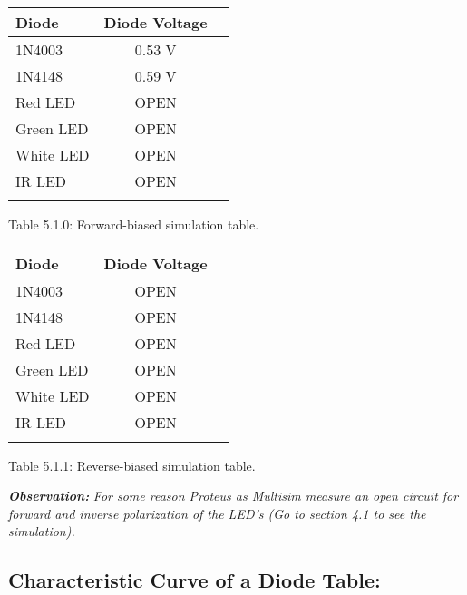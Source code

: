 \documentclass[10pt,a4paper]{article}
\begin{document}
\begin{multicols}{2}
\begin{center}
\begin{tabular}[.5cm]{l c c }
\toprule
Diode & Diode Voltage \\
\midrule
1N4003 & 0.53 V \\
\cmidrule{1-2}
1N4148 &  0.59 V \\
\cmidrule{1-2}
Red LED & OPEN \\
\cmidrule{1-2}
Green LED & OPEN \\
\cmidrule{1-2}
White LED & OPEN \\
\cmidrule{1-2}
IR LED & OPEN \\
\bottomrule
\linebreak
\end{tabular}
\centering \linebreak \linebreak Table 5.1.0: Forward-biased simulation table.
\end{center} 

\begin{center}
\begin{tabular}[.5cm]{l c c }
\toprule
Diode & Diode Voltage \\
\midrule
1N4003 & OPEN \\
\cmidrule{1-2}
1N4148 & OPEN \\
\cmidrule{1-2}
Red LED & OPEN \\
\cmidrule{1-2}
Green LED & OPEN \\
\cmidrule{1-2}
White LED & OPEN \\
\cmidrule{1-2}
IR LED & OPEN \\
\bottomrule
\linebreak
\end{tabular}
\centering \linebreak \linebreak Table 5.1.1: Reverse-biased simulation table.
\end{center} 
\end{multicols}

{\bfseries\itshape Observation:} {\itshape For some reason Proteus as Multisim measure an open circuit for forward and inverse polarization of the LED's (Go to section 4.1 to see the simulation).}

\subsection{Characteristic Curve of a Diode Table:}
\end{document}
